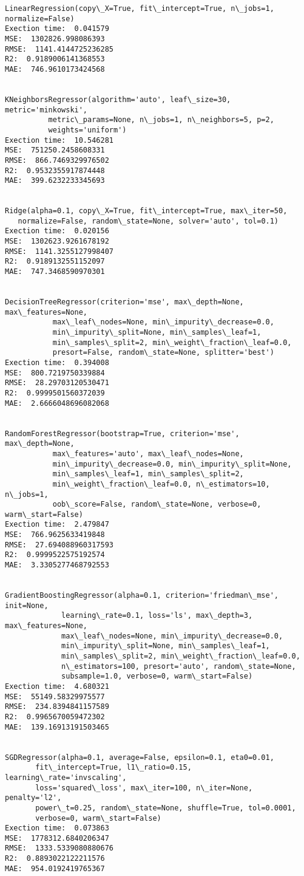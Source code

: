 \documentclass[11pt]{article}
\begin{document}
    \begin{Verbatim}[commandchars=\\\{\}]
LinearRegression(copy\_X=True, fit\_intercept=True, n\_jobs=1, normalize=False)
Exection time:  0.041579
MSE:  1302826.998086393
RMSE:  1141.4144725236285
R2:  0.9189006141368553
MAE:  746.9610173424568


KNeighborsRegressor(algorithm='auto', leaf\_size=30, metric='minkowski',
          metric\_params=None, n\_jobs=1, n\_neighbors=5, p=2,
          weights='uniform')
Exection time:  10.546281
MSE:  751250.2458608331
RMSE:  866.7469329976502
R2:  0.9532355917874448
MAE:  399.6232233345693


Ridge(alpha=0.1, copy\_X=True, fit\_intercept=True, max\_iter=50,
   normalize=False, random\_state=None, solver='auto', tol=0.1)
Exection time:  0.020156
MSE:  1302623.9261678192
RMSE:  1141.3255127998407
R2:  0.9189132551152097
MAE:  747.3468590970301


DecisionTreeRegressor(criterion='mse', max\_depth=None, max\_features=None,
           max\_leaf\_nodes=None, min\_impurity\_decrease=0.0,
           min\_impurity\_split=None, min\_samples\_leaf=1,
           min\_samples\_split=2, min\_weight\_fraction\_leaf=0.0,
           presort=False, random\_state=None, splitter='best')
Exection time:  0.394008
MSE:  800.7219750339884
RMSE:  28.29703120530471
R2:  0.9999501560372039
MAE:  2.6666048696082068


RandomForestRegressor(bootstrap=True, criterion='mse', max\_depth=None,
           max\_features='auto', max\_leaf\_nodes=None,
           min\_impurity\_decrease=0.0, min\_impurity\_split=None,
           min\_samples\_leaf=1, min\_samples\_split=2,
           min\_weight\_fraction\_leaf=0.0, n\_estimators=10, n\_jobs=1,
           oob\_score=False, random\_state=None, verbose=0, warm\_start=False)
Exection time:  2.479847
MSE:  766.9625633419848
RMSE:  27.694088960317593
R2:  0.9999522575192574
MAE:  3.3305277468792553


GradientBoostingRegressor(alpha=0.1, criterion='friedman\_mse', init=None,
             learning\_rate=0.1, loss='ls', max\_depth=3, max\_features=None,
             max\_leaf\_nodes=None, min\_impurity\_decrease=0.0,
             min\_impurity\_split=None, min\_samples\_leaf=1,
             min\_samples\_split=2, min\_weight\_fraction\_leaf=0.0,
             n\_estimators=100, presort='auto', random\_state=None,
             subsample=1.0, verbose=0, warm\_start=False)
Exection time:  4.680321
MSE:  55149.58329975577
RMSE:  234.8394841157589
R2:  0.9965670059472302
MAE:  139.16913191503465


SGDRegressor(alpha=0.1, average=False, epsilon=0.1, eta0=0.01,
       fit\_intercept=True, l1\_ratio=0.15, learning\_rate='invscaling',
       loss='squared\_loss', max\_iter=100, n\_iter=None, penalty='l2',
       power\_t=0.25, random\_state=None, shuffle=True, tol=0.0001,
       verbose=0, warm\_start=False)
Exection time:  0.073863
MSE:  1778312.6840206347
RMSE:  1333.5339080880676
R2:  0.8893022122211576
MAE:  954.0192419765367



    \end{Verbatim}
\end{document}
